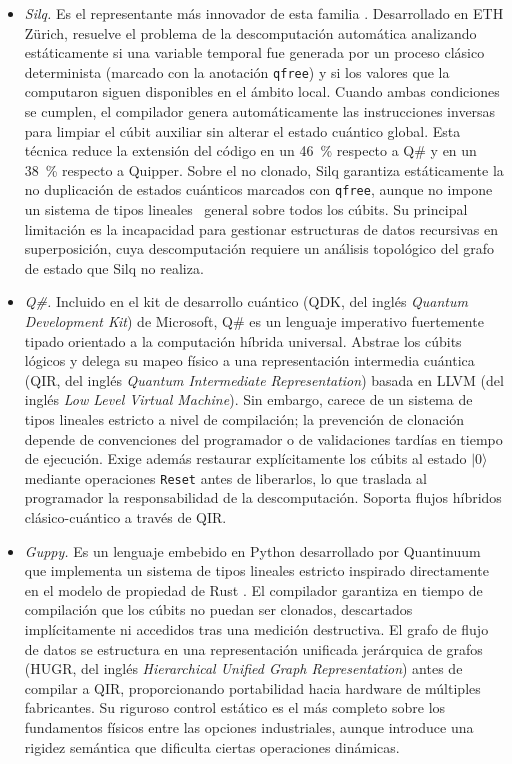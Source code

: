 \begin{itemize}
  \item \textit{Silq.} Es el representante más innovador de esta familia \cite{silq_2020}. Desarrollado en ETH Zürich, resuelve el problema de la descomputación automática analizando estáticamente si una variable temporal fue generada por un proceso clásico determinista (marcado con la anotación \lstinline|qfree|) y si los valores que la computaron siguen disponibles en el ámbito local. Cuando ambas condiciones se cumplen, el compilador genera automáticamente las instrucciones inversas para limpiar el cúbit auxiliar sin alterar el estado cuántico global. Esta técnica reduce la extensión del código en un 46~\% respecto a Q\# y en un 38~\% respecto a Quipper. Sobre el no clonado, Silq garantiza estáticamente la no duplicación de estados cuánticos marcados con \lstinline|qfree|, aunque no impone un sistema de tipos lineales~\cite{wadler_1990} general sobre todos los cúbits. Su principal limitación es la incapacidad para gestionar estructuras de datos recursivas en superposición, cuya descomputación requiere un análisis topológico del grafo de estado que Silq no realiza.

  \item \textit{Q\#.} Incluido en el kit de desarrollo cuántico (QDK, del inglés \textit{Quantum Development Kit}) de Microsoft, Q\# \cite{qsharp_2018} es un lenguaje imperativo fuertemente tipado orientado a la computación híbrida universal. Abstrae los cúbits lógicos y delega su mapeo físico a una representación intermedia cuántica (QIR, del inglés \textit{Quantum Intermediate Representation}) basada en LLVM (del inglés \textit{Low Level Virtual Machine}). Sin embargo, carece de un sistema de tipos lineales estricto a nivel de compilación; la prevención de clonación depende de convenciones del programador o de validaciones tardías en tiempo de ejecución. Exige además restaurar explícitamente los cúbits al estado $|0\rangle$ mediante operaciones \lstinline|Reset| antes de liberarlos, lo que traslada al programador la responsabilidad de la descomputación. Soporta flujos híbridos clásico-cuántico a través de QIR.

  \item \textit{Guppy.} Es un lenguaje embebido en Python desarrollado por Quantinuum que implementa un sistema de tipos lineales estricto inspirado directamente en el modelo de propiedad de Rust \cite{guppy_2024}. El compilador garantiza en tiempo de compilación que los cúbits no puedan ser clonados, descartados implícitamente ni accedidos tras una medición destructiva. El grafo de flujo de datos se estructura en una representación unificada jerárquica de grafos (HUGR, del inglés \textit{Hierarchical Unified Graph Representation}) antes de compilar a QIR, proporcionando portabilidad hacia hardware de múltiples fabricantes. Su riguroso control estático es el más completo sobre los fundamentos físicos entre las opciones industriales, aunque introduce una rigidez semántica que dificulta ciertas operaciones dinámicas.


\end{itemize}
